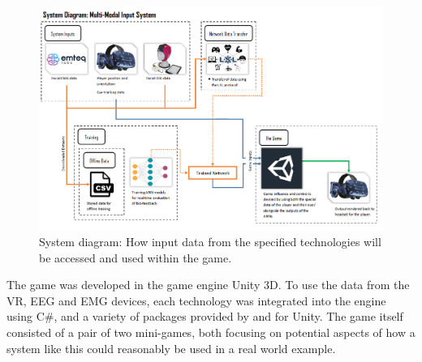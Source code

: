 \documentclass[11pt, a4paper]{article}
\begin{document}
\begin{figure}[H]
	\centering
	\includegraphics[width = 0.9 \linewidth] {[ Figures ]/System Diagram.png}
	\caption{System diagram: How input data from the specified technologies will be accessed and used within the game.}
	\label{fig:system_diagram_:_generic}
\end{figure}



The game was developed in the game engine Unity 3D. To use the data from the VR, EEG and EMG devices, each technology was integrated into the engine using C\#, and a variety of packages provided by and for Unity. The game itself consisted of a pair of two mini-games, both focusing on potential aspects of how a system like this could reasonably be used in a real world example. 
\end{document}
